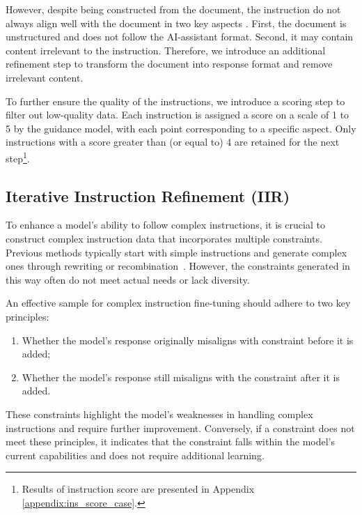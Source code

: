 However, despite being constructed from the document, the instruction do not always align well with the document in two key aspects \cite{nguyen2024better}. First, the document is unstructured and does not follow the AI-assistant format. Second, it may contain content irrelevant to the instruction. Therefore, we introduce an additional refinement step to transform the document into response format and remove irrelevant content.

To further ensure the quality of the instructions, we introduce a scoring step to filter out low-quality data. Each instruction is assigned a score on a scale of 1 to 5 by the guidance model, with each point corresponding to a specific aspect. Only instructions with a score greater than (or equal to) 4 are retained for the next step\footnote{Results of instruction score are presented in Appendix \ref{appendix:ins_score_case}.}.

\subsection{Iterative Instruction Refinement (IIR)}
\label{sec:IIR}
To enhance a model’s ability to follow complex instructions, it is crucial to construct complex instruction data that incorporates multiple constraints. Previous methods typically start with simple instructions and generate complex ones through rewriting or recombination~\cite{xu2023wizardlm}. However, the constraints generated in this way often do not meet actual needs or lack diversity.

An effective sample for complex instruction fine-tuning should adhere to two key principles:

\begin{enumerate}[itemsep=1mm, parsep=0pt]
    \item Whether the model’s response originally misaligns with constraint before it is added;
    \item Whether the model’s response still misaligns with the constraint after it is added.
\end{enumerate}

These constraints highlight the model’s weaknesses in handling complex instructions and require further improvement. Conversely, if a constraint does not meet these principles, it indicates that the constraint falls within the model’s current capabilities and does not require additional learning.

